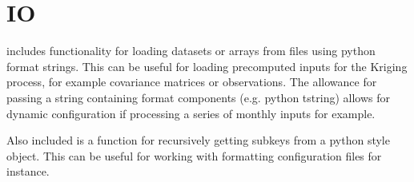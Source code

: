 \documentclass[letterpaper,10pt,english]{sphinxmanual}
\begin{document}
\section{IO}
\label{\detokenize{misc:module-glomar_gridding.io}}\label{\detokenize{misc:io}}
\sphinxAtStartPar
{} includes functionality for loading datasets or arrays from
 files using python format strings. This can be useful for loading
pre\sphinxhyphen{}computed inputs for the Kriging process, for example covariance matrices or
observations. The allowance for passing a string containing format components
(e.g. python t\sphinxhyphen{}string) allows for dynamic configuration if processing a series
of monthly inputs for example.

\sphinxAtStartPar
Also included is a function for recursively getting sub\sphinxhyphen{}keys from a python
 style object. This can be useful for working with  formatting
configuration files for instance.
\end{document}
